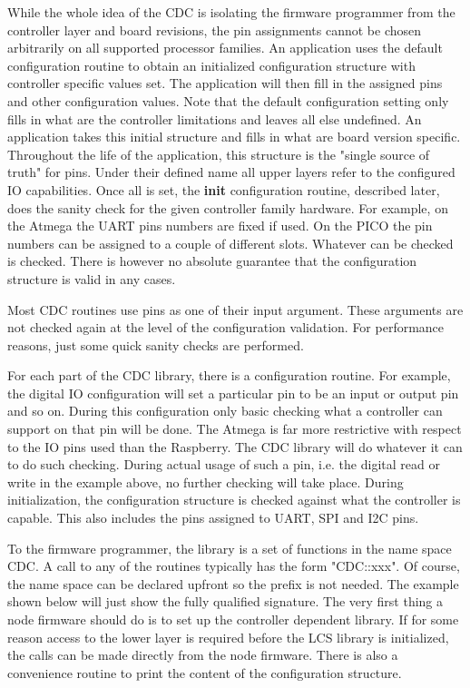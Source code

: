 While the whole idea of the CDC is isolating the firmware programmer from the controller layer and board revisions, the pin assignments cannot be chosen arbitrarily on all supported processor families. An application uses the default configuration routine to obtain an initialized configuration structure with controller specific values set. The application will then fill in the assigned pins and other configuration values. Note that the default configuration setting only fills in what are the controller limitations and leaves all else undefined. An application takes this initial structure and fills in what are board version specific. Throughout the life of the application, this structure is the "single source of truth" for pins. Under their defined name all upper layers refer to the configured IO capabilities. Once all is set, the \textbf{init} configuration routine, described later, does the sanity check for the given controller family hardware. For example, on the Atmega the UART pins numbers are fixed if used. On the PICO the pin numbers can be assigned to a couple of different slots. Whatever can be checked is checked. There is however no absolute guarantee that the configuration structure is valid in any cases.

Most CDC routines use pins as one of their input argument. These arguments are not checked again at the level of the configuration validation. For performance reasons, just some quick sanity checks are performed.

For each part of the CDC library, there is a configuration routine. For example, the digital IO configuration will set a particular pin to be an input or output pin and so on. During this configuration only basic checking what a controller can support on that pin will be done. The Atmega is far more restrictive with respect to the IO pins used than the Raspberry. The CDC library will do whatever it can to do such checking. During actual usage of such a pin, i.e. the digital read or write in the example above, no further checking will take place. During initialization, the configuration structure is checked against what the controller is capable. This also includes the pins assigned to UART, SPI and I2C pins.


To the firmware programmer, the library is a set of functions in the name space CDC. A call to any of the routines typically has the form "CDC::xxx". Of course, the name space can be declared upfront so the prefix is not needed. The example shown below will just show the fully qualified signature. The very first thing a node firmware should do is to set up the controller dependent library. If for some reason access to the lower layer is required before the LCS library is initialized, the calls can be made directly from the node firmware. There is also a convenience routine to print the content of the configuration structure.

